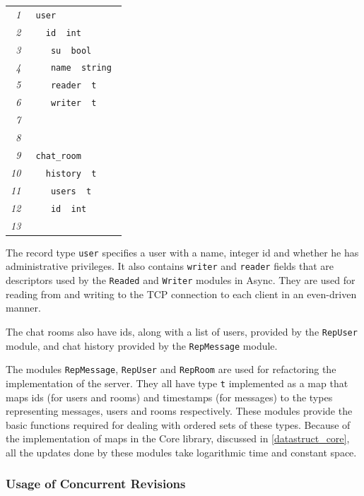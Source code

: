 \documentclass[12pt,twoside,notitlepage]{report}
\newcommand{\mlkeyword}[1]{\mbox{\color{red}{#1}}}
\newcommand{\mloperator}[1]{\mbox{\color{darkgreen}{#1}}}
\newcommand{\mlmodulename}[1]{\mbox{\color{navy}{#1}}}
\newcommand{\mlcodeline}[2]{\tiny\sl #1 & \begin{minipage}[c]{0.8\linewidth}\begin{alltt}\mbox{#2}\end{alltt}\end{minipage}\\}
\begin{document}
{{\scriptsize\noindent\begin{longtable}{r|l}
\mlcodeline{1}{\mlkeyword{type}~user~\mlkeyword{=}
}
\mlcodeline{2}{~~\mloperator{\{}~id~\mloperator{\mbox{\COLON}}~int\mloperator{\mbox{\SC}}~~
}
\mlcodeline{3}{~~~~su~\mloperator{\mbox{\COLON}}~bool\mloperator{\mbox{\SC}}
}
\mlcodeline{4}{~~~~name~\mloperator{\mbox{\COLON}}~string\mloperator{\mbox{\SC}}
}
\mlcodeline{5}{~~~~reader~\mloperator{\mbox{\COLON}}~\mlmodulename{Reader}\mbox{}\mloperator{.}t\mloperator{\mbox{\SC}}
}
\mlcodeline{6}{~~~~writer~\mloperator{\mbox{\COLON}}~\mlmodulename{Writer}\mbox{}\mloperator{.}t\mloperator{\mbox{\SC}}
}
\mlcodeline{7}{~~\mloperator{\}}
}
\mlcodeline{8}{
}
\mlcodeline{9}{\mlkeyword{type}~chat\_{}room~\mlkeyword{=}~
}
\mlcodeline{10}{~~\mloperator{\{}~history~\mloperator{\mbox{\COLON}}~\mlmodulename{RepMessage}\mbox{}\mloperator{.}t\mloperator{\mbox{\SC}}
}
\mlcodeline{11}{~~~~users~\mloperator{\mbox{\COLON}}~\mlmodulename{RepUser}\mbox{}\mloperator{.}t\mloperator{\mbox{\SC}}
}
\mlcodeline{12}{~~~~id~\mloperator{\mbox{\COLON}}~int\mloperator{\mbox{\SC}}
}
\mlcodeline{13}{~~\mloperator{\}}}
\end{longtable}
}

The record type {\tt user} specifies a user with a name, integer id and whether he has administrative privileges. It also contains {\tt writer} and {\tt reader} fields that are descriptors used by the {\tt Readed} and {\tt Writer} modules in Async. They are used for reading from and writing to the TCP connection to each client in an even-driven manner.

The chat rooms also have ids, along with a list of users, provided by the {\tt RepUser} module, and chat history provided by the {\tt RepMessage} module.

The modules {\tt RepMessage}, {\tt RepUser} and {\tt RepRoom} are used for refactoring the implementation of the server. They all have type {\tt t} implemented as a map that maps ids (for users and rooms) and timestamps (for messages) to the types representing messages, users and rooms respectively. These modules provide the basic functions required for dealing with ordered sets of these types. Because of the implementation of maps in the Core library, discussed in \ref{datastruct_core}, all the updates done by these modules take logarithmic time and constant space.     

\subsubsection{Usage of Concurrent Revisions}

}
\end{document}
